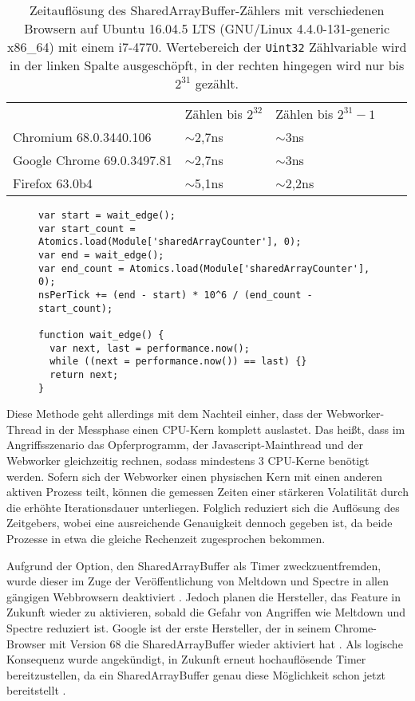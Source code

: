 \label{tbl:times_res}
\begin{table}[h]
\caption{Zeitauflösung des SharedArrayBuffer-Zählers mit verschiedenen Browsern auf Ubuntu 16.04.5 LTS (GNU/Linux 4.4.0-131-generic x86_64) mit einem i7-4770. Wertebereich der \lstinline{Uint32} Zählvariable wird in der linken Spalte ausgeschöpft, in der rechten hingegen wird nur bis $2^{31}$ gezählt.}
\begin{tabular}{lllll}
                           & Zählen bis $2^{32}$ & Zählen bis $2^{31}-1$ &  &  \\[10pt]
Chromium 68.0.3440.106     & $\sim$2,7ns                      & $\sim$3ns                        &  &  \\
Google Chrome 69.0.3497.81 & $\sim$2,7ns                      & $\sim$3ns                        &  &  \\
Firefox 63.0b4             & $\sim$5,1ns                      & $\sim$2,2ns                      &  & 
\end{tabular}
\end{table}


\begin{figure}[h]
\begin{lstlisting}[caption=main.js: Code welcher die Timerauflösung bestimmt,label=alg_list:getResolutionNS]
var start = wait_edge();
var start_count = Atomics.load(Module['sharedArrayCounter'], 0);
var end = wait_edge();
var end_count = Atomics.load(Module['sharedArrayCounter'], 0);
nsPerTick += (end - start) * 10^6 / (end_count - start_count);

function wait_edge() {
  var next, last = performance.now();
  while ((next = performance.now()) == last) {}
  return next;
}
\end{lstlisting}
\end{figure}

Diese Methode geht allerdings mit dem Nachteil einher, dass der Webworker-Thread in der Messphase einen CPU-Kern komplett auslastet. Das heißt, dass im Angriffsszenario das Opferprogramm, der Javascript-Mainthread und der Webworker gleichzeitig rechnen, sodass mindestens 3 CPU-Kerne benötigt werden. 
Sofern sich der Webworker einen physischen Kern mit einen anderen aktiven Prozess teilt, können die gemessen Zeiten einer stärkeren Volatilität durch die erhöhte Iterationsdauer unterliegen.
Folglich reduziert sich die Auflösung des Zeitgebers, wobei eine ausreichende Genauigkeit dennoch gegeben ist, da beide Prozesse in etwa die gleiche Rechenzeit zugesprochen bekommen.

Aufgrund der Option, den SharedArrayBuffer als Timer zweckzuentfremden, wurde dieser im Zuge der Veröffentlichung von Meltdown und Spectre in allen gängigen Webbrowsern deaktiviert \cite{FirefoxSharedArrayBuffer}. Jedoch planen die Hersteller, das Feature in Zukunft wieder zu aktivieren, sobald die Gefahr von Angriffen wie Meltdown und Spectre reduziert ist. 
Google ist der erste Hersteller, der in seinem Chrome-Browser mit Version 68 die SharedArrayBuffer wieder aktiviert hat \cite{ChromeSharedArrayBufferAgain}. 
Als logische Konsequenz wurde angekündigt, in Zukunft erneut hochauflösende Timer bereitzustellen, da ein SharedArrayBuffer genau diese Möglichkeit schon jetzt bereitstellt \cite{ChromeHighResolutionTimerAgain}.

